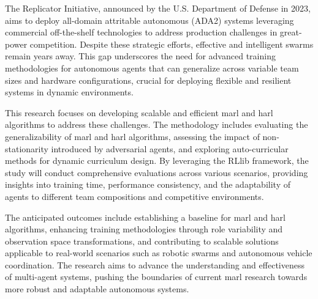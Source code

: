 The Replicator Initiative, announced by the U.S. Department of Defense in 2023, 
aims to deploy all-domain attritable autonomous (ADA2) systems leveraging 
commercial off-the-shelf technologies to address production challenges in 
great-power competition. Despite these strategic efforts, effective and 
intelligent swarms remain years away. This gap underscores the need for 
advanced training methodologies for autonomous agents 
that can generalize across variable team sizes and hardware configurations, 
crucial for deploying flexible and resilient systems in dynamic environments.

This research focuses on developing scalable and efficient 
\gls{marl} and \gls{harl} algorithms to address these challenges. 
The methodology includes evaluating the generalizability of 
\gls{marl} and \gls{harl} algorithms, 
assessing the impact of non-stationarity introduced by adversarial agents, 
and exploring auto-curricular methods for dynamic curriculum design. 
By leveraging the RLlib framework, the study will conduct comprehensive 
evaluations across various scenarios, providing insights into training time, 
performance consistency, and the adaptability of agents to different team 
compositions and competitive environments.

The anticipated outcomes include establishing a baseline for 
\gls{marl} and \gls{harl} algorithms, enhancing training methodologies 
through role variability and observation space transformations, 
and contributing to scalable solutions applicable to real-world 
scenarios such as robotic swarms and autonomous vehicle coordination. 
The research aims to advance the understanding and effectiveness 
of multi-agent systems, pushing the boundaries of current \gls{marl} 
research towards more robust and adaptable autonomous systems.

\glsresetall